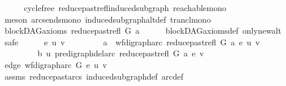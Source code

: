 \begin{isabellebody}
\ \ \ \ \isamarkupfalse%
\ cycle{\isacharunderscore}{\kern0pt}free\ reduce{\isacharunderscore}{\kern0pt}past{\isacharunderscore}{\kern0pt}refl{\isacharunderscore}{\kern0pt}induced{\isacharunderscore}{\kern0pt}subgraph\ reachable{\isacharunderscore}{\kern0pt}mono\isanewline
\ \ \ \ \isamarkupfalse%
\ {\isacharparenleft}{\kern0pt}meson\ arcs{\isacharunderscore}{\kern0pt}ends{\isacharunderscore}{\kern0pt}mono\ induced{\isacharunderscore}{\kern0pt}subgraph{\isacharunderscore}{\kern0pt}altdef\ trancl{\isacharunderscore}{\kern0pt}mono{\isacharparenright}{\kern0pt}\ \isanewline
{}\isamarkupfalse%
\isanewline
\ \ \isamarkupfalse%
\ {\isachardoublequoteopen}blockDAG{\isacharunderscore}{\kern0pt}axioms\ {\isacharparenleft}{\kern0pt}reduce{\isacharunderscore}{\kern0pt}past{\isacharunderscore}{\kern0pt}refl\ G\ a{\isacharparenright}{\kern0pt}{\isachardoublequoteclose}\isanewline
\ \ \ \ \isamarkupfalse%
\ blockDAG{\isacharunderscore}{\kern0pt}axioms{\isacharunderscore}{\kern0pt}def\ only{\isacharunderscore}{\kern0pt}new{\isacharunderscore}{\kern0pt}alt\isanewline
\ \ \isamarkupfalse%
\ safe\isanewline
\ \ \ \ \isamarkupfalse%
\ e\ u\ v\ \isanewline
\ \ \ \ \ \ \isamarkupfalse%
\ a{\isacharcolon}{\kern0pt}\ {\isachardoublequoteopen}\ wf{\isacharunderscore}{\kern0pt}digraph{\isachardot}{\kern0pt}arc\ {\isacharparenleft}{\kern0pt}reduce{\isacharunderscore}{\kern0pt}past{\isacharunderscore}{\kern0pt}refl\ G\ a{\isacharparenright}{\kern0pt}\ e\ {\isacharparenleft}{\kern0pt}u{\isacharcomma}{\kern0pt}\ v{\isacharparenright}{\kern0pt}{\isachardoublequoteclose}\isanewline
\ \ \ \ \ \ \ \ \ b{\isacharcolon}{\kern0pt}\ {\isachardoublequoteopen}u\ {\isasymrightarrow}\isactrlsup {\isacharplus}{\kern0pt}\isactrlbsub pre{\isacharunderscore}{\kern0pt}digraph{\isachardot}{\kern0pt}del{\isacharunderscore}{\kern0pt}arc\ {\isacharparenleft}{\kern0pt}reduce{\isacharunderscore}{\kern0pt}past{\isacharunderscore}{\kern0pt}refl\ G\ a{\isacharparenright}{\kern0pt}\ e\isactrlesub \ v{\isachardoublequoteclose}\isanewline
\ \ \ \ \ \ \isamarkupfalse%
\ edge{\isacharcolon}{\kern0pt}\ {\isachardoublequoteopen}wf{\isacharunderscore}{\kern0pt}digraph{\isachardot}{\kern0pt}arc\ G\ e\ {\isacharparenleft}{\kern0pt}u{\isacharcomma}{\kern0pt}\ v{\isacharparenright}{\kern0pt}{\isachardoublequoteclose}\isanewline
\ \ \ \ \ \ \ \ \isamarkupfalse%
\ assms\ reduce{\isacharunderscore}{\kern0pt}past{\isacharunderscore}{\kern0pt}arcs{}\ induced{\isacharunderscore}{\kern0pt}subgraph{\isacharunderscore}{\kern0pt}def\ arc{\isacharunderscore}{\kern0pt}def\ \isanewline

\end{isabellebody}

